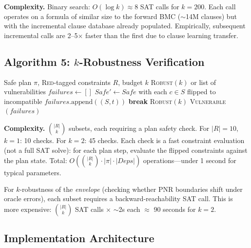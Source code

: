 \documentclass[10pt,twocolumn]{article}
\begin{document}
\textbf{Complexity.} Binary search: $O(\log k) \approx 8$ SAT calls for $k = 200$. Each call operates on a formula of similar size to the forward BMC ($\sim$14M clauses) but with the incremental clause database already populated. Empirically, subsequent incremental calls are 2--5$\times$ faster than the first due to clause learning transfer.

\subsection{Algorithm 5: $k$-Robustness Verification}
\label{sec:alg-robustness}

\begin{algorithm}[t]
\caption{\textsc{KRobustCheck}: Robustness verification against oracle errors}
\label{alg:krobust}
\begin{algorithmic}[1]
\Require Safe plan $\pi$, \textsc{Red}-tagged constraints $R$, budget $k$
\Ensure \textsc{Robust}$(k)$ or list of vulnerabilities
\State $\mathit{failures} \gets []$
 
  \State $\mathit{Safe}' \gets \mathit{Safe}$ with each $c \in S$ flipped to incompatible
      \State $\mathit{failures}.\mathrm{append}((S, t))$
      \State \textbf{break} 
    \EndIf
  \EndFor
\EndFor
{}
  \State \Return \textsc{Robust}$(k)$
\Else
  \State \Return \textsc{Vulnerable}$(\mathit{failures})$
\EndIf
\end{algorithmic}
\end{algorithm}

\textbf{Complexity.} $\binom{|R|}{k}$ subsets, each requiring a plan safety check. For $|R| = 10$, $k = 1$: 10 checks. For $k = 2$: 45 checks. Each check is a fast constraint evaluation (not a full SAT solve): for each plan step, evaluate the flipped constraints against the plan state. Total: $O\!\left(\binom{|R|}{k} \cdot |\pi| \cdot |\mathit{Deps}|\right)$ operations---under 1 second for typical parameters.

For $k$-robustness of the \emph{envelope} (checking whether PNR boundaries shift under oracle errors), each subset requires a backward-reachability SAT call. This is more expensive: $\binom{|R|}{k}$ SAT calls $\times$ $\sim$2s each $\approx$ 90 seconds for $k=2$.

\subsection{Implementation Architecture}
\label{sec:impl-architecture}
\end{document}
